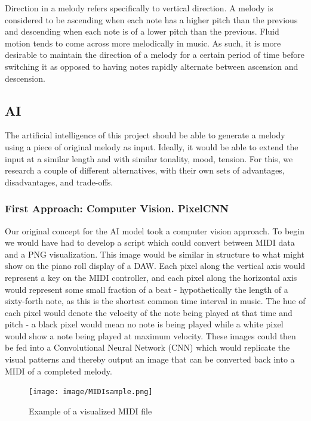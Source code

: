 Direction in a melody refers specifically to vertical direction. A melody is considered to be
ascending when each note has a higher pitch than the previous and descending when each note is of a
lower pitch than the previous. Fluid motion tends to come across more melodically in music. As
such, it is more desirable to maintain the direction of a melody for a certain period of time
before switching it as opposed to having notes rapidly alternate between ascension and descension.\autocite{contour}

\subsection{AI}

The artificial intelligence of this project should be able to generate a melody using
a piece of original melody as input. Ideally, it would be able to extend the input at a
similar length and with similar tonality, mood, tension. For this, we research
a couple of different alternatives, with their own sets of advantages, disadvantages, and
trade-offs.

\subsubsection{First Approach: Computer Vision. PixelCNN}

Our original concept for the AI model took a computer vision approach. To begin we would
have had to develop a script which could convert between MIDI data and a PNG
visualization. This image would be similar in structure to what might show on the piano
roll display of a DAW. Each pixel along the vertical axis would represent a key on the
MIDI controller, and each pixel along the horizontal axis would represent some small
fraction of a beat - hypothetically the length of a sixty-forth note, as this is the
shortest common time interval in music. The hue of each pixel would denote the velocity
of the note being played at that time and pitch - a black pixel would mean no note is
being played while a white pixel would show a note being played at maximum velocity.
These images could then be fed into a Convolutional Neural Network (CNN) which would
replicate the visual patterns and thereby output an image that can be converted back into
a MIDI of a completed melody.

\begin{figure}[h!]
  \centering
  \texttt{[image: image/MIDIsample.png]}
  \caption{Example of a visualized MIDI file}
  \label{fig:midi_sample}
\end{figure}

